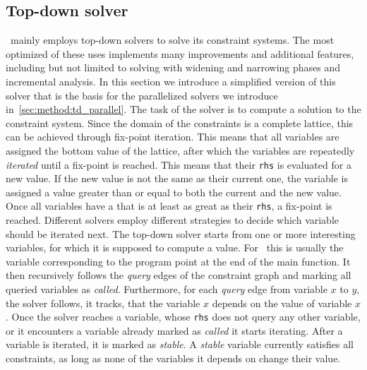   \subsection{Top-down solver}
  \label{sec:background:td}
  \gob\ mainly employs top-down solvers to solve its constraint systems. The most optimized of these uses implements many improvements and additional features, including but not limited to solving with widening and narrowing phases and incremental analysis. 
  In this section we introduce a simplified version of this solver that is the basis for the parallelized solvers we introduce in~\autoref{sec:method:td_parallel}.
  The task of the solver is to compute a solution to the constraint system. Since the domain of the constraints is a complete lattice, this can be achieved through fix-point iteration. This means that all variables are assigned the bottom value of the lattice, after which the variables are repeatedly \textit{iterated} until a fix-point is reached. This means that their \texttt{rhs} is evaluated for a new value. If the new value is not the same as their current one, the variable is assigned a value greater than or equal to both the current and the new value. Once all variables have a that is at least as great as their \texttt{rhs}, a fix-point is reached.
  Different solvers employ different strategies to decide which variable should be iterated next. The top-down solver starts from one or more interesting variables, for which it is supposed to compute a value. For \gob\ this is usually the variable corresponding to the program point at the end of the main function. It then recursively follows the \textit{query} edges of the constraint graph and marking all queried variables as \textit{called}. Furthermore, for each \textit{query} edge from variable $x$ to $y$, the solver follows, it tracks, that the variable $x$ depends on the value of variable $x$. Once the solver reaches a variable, whose \texttt{rhs} does not query any other variable, or it encounters a variable already marked as \textit{called} it starts iterating. After a variable is iterated, it is marked as \textit{stable}. A \textit{stable} variable currently satisfies all constraints, as long as none of the variables it depends on change their value.  

